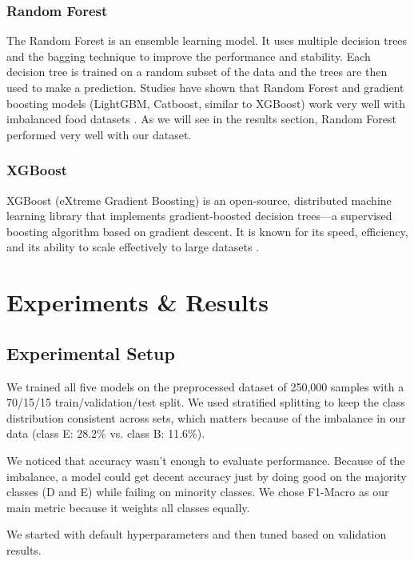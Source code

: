 \documentclass[11pt,a4paper]{article}
\begin{document}
\subsubsection{Random Forest}
The Random Forest is an ensemble learning model. It uses multiple decision trees and the bagging technique to improve the performance and stability.
Each decision tree is trained on a random subset of the data and the trees are then used to make a prediction.
Studies have shown that Random Forest and gradient boosting models (LightGBM, Catboost, similar to XGBoost) work very well with imbalanced food datasets
\cite{arora2025applicationmachinelearningpredict}.
As we will see in the results section, Random Forest performed very well with our dataset.

\subsubsection{XGBoost}
XGBoost (eXtreme Gradient Boosting) is an open-source, distributed machine learning library that implements gradient-boosted decision
 trees—a supervised boosting algorithm based on gradient descent. It is known for its speed, efficiency, and its ability to scale effectively to large
  datasets \cite{Chen:2016:XST:2939672.2939785}.




  \section{Experiments \& Results}

  \subsection{Experimental Setup}
  
  We trained all five models on the preprocessed dataset of 250,000 samples with a 70/15/15 train/validation/test split. We used stratified splitting to keep the class distribution consistent across sets, which matters because of the imbalance in our data (class E: 28.2\% vs. class B: 11.6\%).
  
  We noticed that accuracy wasn't enough to evaluate performance. Because of the imbalance, a model could get decent accuracy just by doing good on the majority classes (D and E) while failing on minority classes. We chose F1-Macro as our main metric because it weights all classes equally.
  
  We started with default hyperparameters and then tuned based on validation results.
\end{document}
